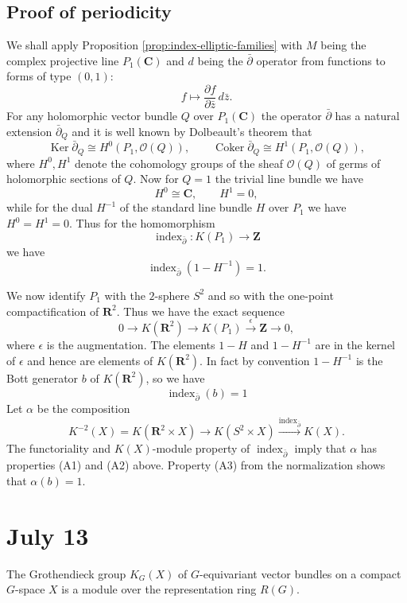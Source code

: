 \documentclass[12pt]{article}
\begin{document}
\subsection{Proof of periodicity}
We shall apply Proposition \ref{prop:index-elliptic-families} with $M$ being the complex projective line $P_1(\mathbf
C)$ and $d$ being the $\bar\partial$ operator from functions to forms of type $(0,1)$:
\[
f \mapsto \frac{\partial f}{\partial\bar z}\,d\bar z.
\]
For any holomorphic vector bundle $Q$ over $P_1(\mathbf C)$ the operator $\bar\partial$ has
a natural extension $\bar\partial_Q$ and it is well known by Dolbeault's theorem that
\[
\operatorname{Ker}\bar\partial_Q \cong H^0(P_1,\mathcal O(Q)), \qquad
\operatorname{Coker}\bar\partial_Q \cong H^1(P_1,\mathcal O(Q)),
\]
where $H^0,H^1$ denote the cohomology groups of the sheaf $\mathcal O(Q)$ of germs of
holomorphic sections of $Q$. Now for $Q=1$ the trivial line bundle we have
\[
H^0\cong \mathbf C, \qquad H^1=0,
\]
while for the dual $H^{-1}$ of the standard line bundle $H$ over $P_1$ we have $H^0=H^1=0$. Thus for the homomorphism
\[
\operatorname{index}_{\bar\partial} : K(P_1)\longrightarrow \mathbf Z
\]
we have
\[
\operatorname{index}_{\bar\partial}(1-H^{-1}) = 1.
\]

We now identify $P_1$ with the $2$-sphere $S^2$ and so with the one-point compactification
of $\mathbf R^2$. Thus we have the exact sequence
\[
0 \to K(\mathbf R^2) \to K(P_1) \xrightarrow{\ \epsilon\ } \mathbf Z \to 0,
\]
where $\epsilon$ is the augmentation. The elements $1-H$ and $1-H^{-1}$ are in the kernel
of $\epsilon$ and hence are elements of $K(\mathbf R^2)$. In fact by convention $1-H^{-1}$ is the Bott generator $b$ of $K(\mathbf R^2)$, so we have
\[
\operatorname{index}_{\bar\partial}(b) = 1 \tag{normalization}
\]
Let $\alpha$ be the composition
\[
K^{-2}(X) = K(\mathbf R^2\times X) \longrightarrow K(S^2\times X)
\xrightarrow{\operatorname{index}_{\bar\partial}} K(X).
\]
The functoriality and $K(X)$-module property of $\operatorname{index}_{\bar\partial}$ imply that $\alpha$ has properties (A1) and (A2) above. Property (A3) from the normalization shows that $\alpha(b)=1$. 
\section{July 13}
The Grothendieck group $K_G(X)$ of $G$-equivariant vector bundles on a compact $G$-space $X$ is a module over the representation ring $R(G)$. 
\end{document}
